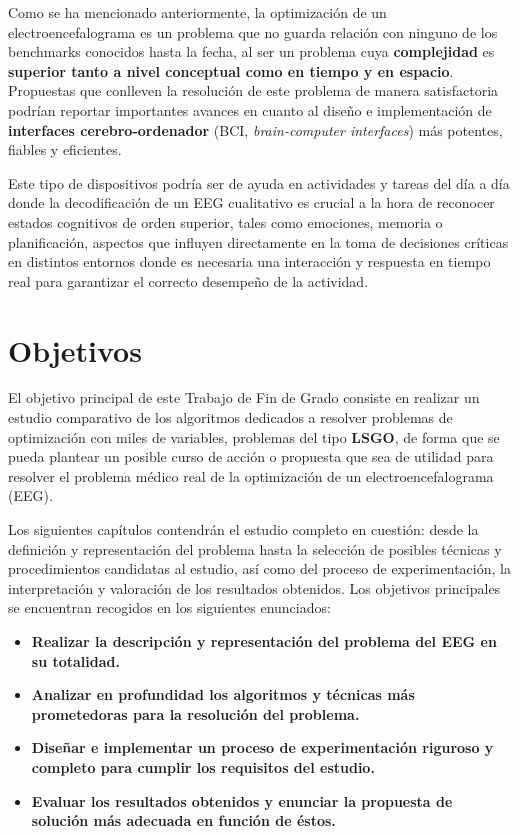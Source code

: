 Como se ha mencionado anteriormente, la optimización de un electroencefalograma es un problema que no guarda relación con ninguno de los benchmarks conocidos hasta la fecha, al ser un problema cuya \textbf{complejidad} es \textbf{superior tanto a nivel conceptual como en tiempo y en espacio}. Propuestas que conlleven la resolución de este problema de manera satisfactoria podrían reportar importantes avances en cuanto al diseño e implementación de \textbf{interfaces cerebro-ordenador} (BCI, \textit{brain-computer interfaces}) más potentes, fiables y eficientes.

Este tipo de dispositivos podría ser de ayuda en actividades y tareas del día a día donde la decodificación de un EEG cualitativo es crucial a la hora de reconocer estados cognitivos de orden superior, tales como emociones, memoria o planificación, aspectos que influyen directamente en la toma de decisiones críticas\cite{EvolutionaryBigOpt} en distintos entornos donde es necesaria una interacción y respuesta en tiempo real para garantizar el correcto desempeño de la actividad.

\section{Objetivos}

El objetivo principal de este Trabajo de Fin de Grado consiste en realizar un estudio comparativo de los algoritmos dedicados a resolver problemas de optimización con miles de variables, problemas del tipo \textbf{LSGO}, de forma que se pueda plantear un posible curso de acción o propuesta que sea de utilidad para resolver el problema médico real de la optimización de un electroencefalograma (EEG).

Los siguientes capítulos contendrán el estudio completo en cuestión: desde la definición y representación del problema hasta la selección de posibles técnicas y procedimientos candidatas al estudio, así como del proceso de experimentación, la interpretación y valoración de los resultados obtenidos. Los objetivos principales se encuentran recogidos en los siguientes enunciados:

\begin{itemize}
	\item \textbf{Realizar la descripción y representación del problema del EEG en su totalidad.}
	\item \textbf{Analizar en profundidad los algoritmos y técnicas más prometedoras para la resolución del problema.}
	\item \textbf{Diseñar e implementar un proceso de experimentación riguroso y completo para cumplir los requisitos del estudio.}
	\item \textbf{Evaluar los resultados obtenidos y enunciar la propuesta de solución más adecuada en función de éstos.}
\end{itemize}

